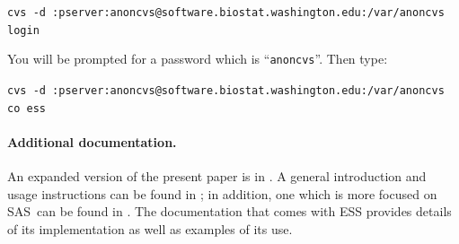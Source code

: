 \documentclass{article}
\newcommand*{\SAS}{\textsc{SAS}}
\newcommand{\stexttt}[1]{{\small\texttt{#1}}}
\begin{document}
\stexttt{cvs -d
  :pserver:anoncvs@software.biostat.washington.edu:/var/anoncvs login}
  
You will be prompted for a password which is ``\stexttt{anoncvs}''.
Then type:

\stexttt{cvs -d
  :pserver:anoncvs@software.biostat.washington.edu:/var/anoncvs co
  ess}

\paragraph{Additional documentation.} 

An expanded version of the present paper is in \citep{RMHHS:2001}.  A
general introduction and usage instructions can be found in
\citep{heiberger:dsc:2001}; in addition, one which is more focused on
\SAS\ can be found in \citep{heiberger:philasugi:2001}.  The
documentation that comes with ESS provides details of its
implementation as well as examples of its use.
\end{document}
